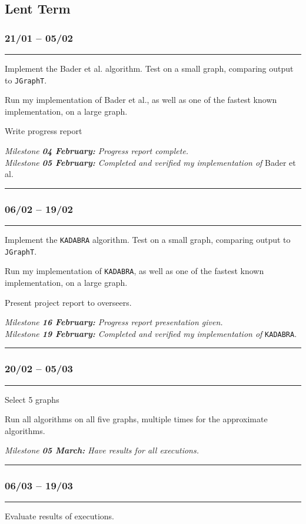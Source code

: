 \documentclass[a4paper,12pt]{article}
\begin{document}
\subsection*{Lent Term}

\subsubsection*{21/01 -- 05/02}\hrule
Implement the Bader et al. algorithm. Test on a small graph, comparing output to \verb|JGraphT|.

\noindent
Run my implementation of Bader et al., as well as one of the fastest known implementation, on a large graph.

\noindent Write progress report

\noindent
\textit{Milestone \textbf{04 February:} Progress report complete.}\\
\textit{Milestone \textbf{05 February:} Completed and verified my implementation of} Bader et al.\\
\hrule
\subsubsection*{06/02 -- 19/02}\hrule
Implement the \verb|KADABRA| algorithm. Test on a small graph, comparing output to \verb|JGraphT|.

\noindent
Run my implementation of \verb|KADABRA|, as well as one of the fastest known implementation, on a large graph.

\noindent
Present project report to overseers.

\noindent
\textit{Milestone \textbf{16 February:} Progress report presentation given.}\\
\textit{Milestone \textbf{19 February:} Completed and verified my implementation of} \verb|KADABRA|.\\
\hrule
\subsubsection*{20/02 -- 05/03}\hrule
Select 5 graphs

\noindent
Run all algorithms on all five graphs, multiple times for the approximate algorithms.

\noindent
\textit{Milestone \textbf{05 March:} Have results for all executions.}\\
\hrule
\subsubsection*{06/03 -- 19/03}\hrule
Evaluate results of executions.
\end{document}
